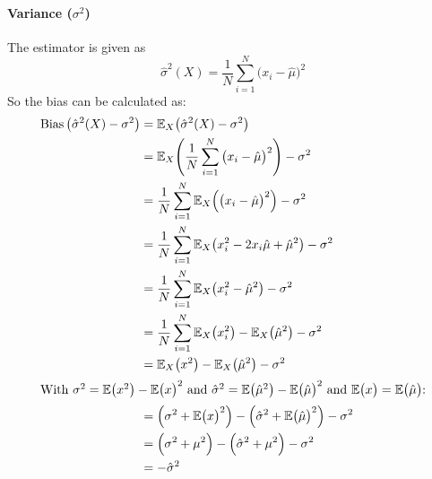 			\paragraph{Variance (\(\sigma^2\))}
				The estimator is given as
				\begin{equation}
					\hat{\sigma}^2(X) = \frac{1}{N} \sum_{i = 1}^{N} \big(x_i - \hat{\mu}\big)^2
				\end{equation}
				So the bias can be calculated as:
				\begin{align}
					\Bias\big(\hat{\sigma}^2(X) - \sigma^2\big) & = \E_X\big(\hat{\sigma}^2(X) - \sigma^2\big)                                                           \\
					                                            & = \E_X\Bigg( \frac{1}{N} \sum_{i = 1}^{N} \big(x_i - \hat{\mu}\big)^2 \Bigg) - \sigma^2                \\
					                                            & = \frac{1}{N} \sum_{i = 1}^{N} \E_X\Big(\big(x_i - \hat{\mu}\big)^2\Big) - \sigma^2                    \\
					                                            & = \frac{1}{N} \sum_{i = 1}^{N} \E_X\big( x_i^2 - 2 x_i \hat{\mu} + \hat{\mu}^2 \big) - \sigma^2        \\
					                                            & = \frac{1}{N} \sum_{i = 1}^{N} \E_X\big( x_i^2 - \hat{\mu}^2 \big) - \sigma^2                          \\
					                                            & = \frac{1}{N} \sum_{i = 1}^{N} \E_X\big( x_i^2 \big) - \E_X\big( \hat{\mu}^2 \big) - \sigma^2          \\
					                                            & = \E_X\big( x^2 \big) - \E_X\big( \hat{\mu}^2 \big) - \sigma^2                                         \\
					\intertext{With \( \sigma^2 = \E\big(x^2\big) - \E\big(x\big)^2 \) and \( \hat{\sigma}^2 = \E\big(\hat{\mu}^2\big) - \E\big(\hat{\mu}\big)^2 \) and \( \E\big(x\big) = \E\big(\hat{\mu}\big) \):}
					                                            & = \Big(\sigma^2 + \E\big(x\big)^2\Big) - \Big(\hat{\sigma}^2 + \E\big(\hat{\mu}\big)^2\Big) - \sigma^2 \\
					                                            & = \Big(\sigma^2 + \mu^2\Big) - \Big(\hat{\sigma}^2 + \mu^2\Big) - \sigma^2                             \\
					                                            & = -\hat{\sigma}^2                                                                                      \\

\end{align}
